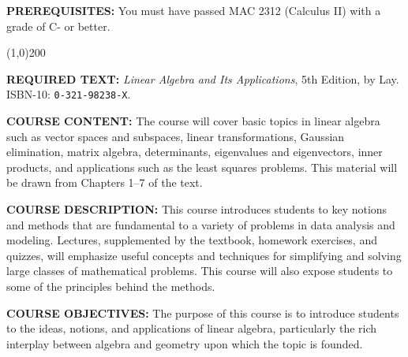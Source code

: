 \documentclass[12pt,oneside]{amsart}
\begin{document}
\noindent \textbf{PREREQUISITES:} You must have passed MAC 2312 (Calculus II) with a grade of C- or better. %

\vspace{-2mm}
\begin{center}
	\line(1,0){200}
\end{center}

\noindent \textbf{REQUIRED TEXT:} \textit{Linear Algebra and Its Applications}, 5th Edition, by Lay. ISBN-10: \texttt{0-321-98238-X}.

\noindent \textbf{COURSE CONTENT:} The course will cover basic topics in linear algebra such as vector spaces and subspaces, linear transformations, Gaussian elimination, matrix algebra, determinants, eigenvalues and eigenvectors, inner products, and applications such as the least squares problems. This material will be drawn from Chapters 1--7 of the text. %

\noindent \textbf{COURSE DESCRIPTION:} This course introduces students to key notions and methods that are fundamental to a variety of problems in data analysis and modeling. Lectures, supplemented by the textbook, homework exercises, and quizzes, will emphasize useful concepts and techniques for simplifying and solving large classes of mathematical problems. This course will also expose students to some of the principles behind the methods.%

\noindent \textbf{COURSE OBJECTIVES:} The purpose of this course is to introduce students to the ideas, notions, and applications of linear algebra, particularly the rich interplay between algebra and geometry upon which the topic is founded.\vspace{-3mm}

\end{document}
